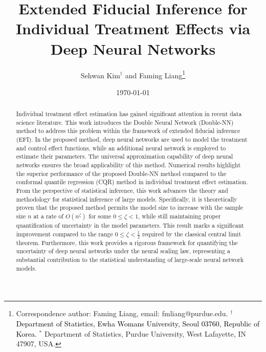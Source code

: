 \documentclass[11pt]{article}
\begin{document}
 

\title{Extended Fiducial Inference for  Individual Treatment Effects via Deep Neural Networks} 

\author{Sehwan Kim$^{\dag}$ and Faming Liang\thanks{Correspondence author: Faming Liang, email: fmliang@purdue.edu.
 $^\dag$ \textcolor{black}{Department of Statistics, Ewha Womans University, Seoul 03760, Republic of Korea.}
  $^*$ Department of Statistics, Purdue University, West Lafayette, IN 47907, USA.
 } }
 

\date{} 

\date{\today}
 
\maketitle

\begin{abstract}
Individual treatment effect estimation has gained significant attention in recent data science literature. This work introduces the Double Neural Network (Double-NN) method to address this problem within the framework of extended fiducial inference (EFI). In the proposed method, deep neural networks are used to model the treatment and control effect functions, while an additional neural network is employed to estimate their parameters. The universal approximation capability of deep neural networks ensures the broad   applicability of this method. Numerical results highlight the superior  performance of the proposed Double-NN method compared to the conformal quantile regression (CQR) method in individual treatment effect estimation. From the perspective of statistical inference, this work advances the theory and methodology for statistical inference of large models. Specifically, it is theoretically proven that the proposed method permits the model size to increase with the sample size $n$ at a rate of $O(n^{\zeta})$ for some  $0 \leq \zeta<1$, while still maintaining proper quantification of uncertainty in the model parameters. This result marks a  significant improvement compared to the range $0\leq \zeta < \frac{1}{2}$ required by the classical central limit theorem.  Furthermore, this work provides a rigorous framework for quantifying the uncertainty of deep neural networks under the neural scaling law, representing a substantial contribution to the statistical understanding of large-scale neural network models.
\end{abstract}
\end{document}
